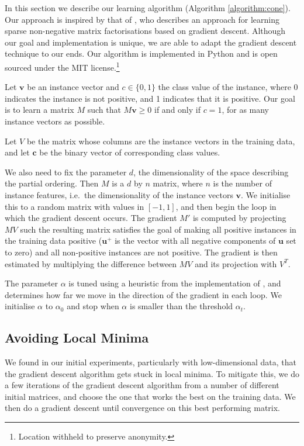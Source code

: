 In this section we describe our learning algorithm (Algorithm
\ref{algorithm:cone}). Our approach is inspired by that of
, who describes an approach for learning sparse
non-negative matrix factorisations based on gradient descent. Although
our goal and implementation is unique, we are able to adapt the
gradient descent technique to our ends. Our algorithm is implemented
in Python and is open sourced under the MIT license.\footnote{Location
  withheld to preserve anonymity.}

Let $\mathbf{v}$ be an instance vector and $c \in \{0,1\}$ the class value of
the instance, where 0 indicates the instance is not positive, and 1
indicates that it is positive. Our goal is to learn a matrix $M$ such
that $M\mathbf{v} \ge 0$ if and only if $c = 1$, for as many instance vectors
as possible.

Let $V$ be the matrix whose columns are the instance vectors in the
training data, and let $\mathbf{c}$ be the binary vector of
corresponding class values.

We also need to fix the parameter $d$, the dimensionality of the space
describing the partial ordering. Then $M$ is a $d$ by $n$ matrix,
where $n$ is the number of instance features, i.e.~the dimensionality
of the instance vectors $\mathbf{v}$. We initialise this to a random
matrix with values in $[-1,1]$, and then begin the loop in which the
gradient descent occurs. The gradient $M'$ is computed by projecting
$MV$ such the resulting matrix satisfies the goal of making all
positive instances in the training data positive ($\mathbf{u}^+$ is
the vector with all negative components of $\mathbf{u}$ set to zero)
and all non-positive instances are not positive. The gradient is then
estimated by multiplying the difference between $MV$ and its
projection with $V^T$.

The parameter $\alpha$ is tuned using a heuristic from the
implementation of , and determines how far we move
in the direction of the gradient in each loop. We initialise $\alpha$
to $\alpha_0$ and stop when $\alpha$ is smaller than the threshold
$\alpha_t$.

\subsection{Avoiding Local Minima}

We found in our initial experiments, particularly with low-dimensional
data, that the gradient descent algorithm gets stuck in local
minima. To mitigate this, we do a few iterations of the gradient
descent algorithm from a number of different initial matrices, and
choose the one that works the best on the training data. We then do a
gradient descent until convergence on this best performing matrix.

